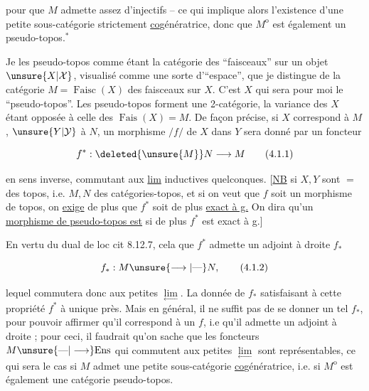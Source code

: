 pour que $M$ admette assez d'injectifs -- ce qui implique alors l'existence d'une petite sous-catégorie strictement \uline{co}génératrice, donc que $M^{\mathrm{o}}$ est également un pseudo-topos.$^{*}$


Je  les  pseudo-topos comme étant la catégorie des ``faisceaux'' sur un objet $\unsure{X|\mathcal X}$, visualisé comme une sorte  d'``espace'', que je distingue de la catégorie $M=\operatorname{Faisc}(X)$ des faisceaux sur $X$.  C'est $X$ qui sera pour moi le ``pseudo-topos''. Les pseudo-topos forment une 2-catégorie, la variance des $X$ étant opposée à celle des  $\operatorname{Fais}(X)=M$.  De façon précise, si $X$ correspond à $M$, $\unsure{Y|\mathcal Y}$ à $N$, un morphisme $/f/$ de $X$ dans $Y$ sera donné par un foncteur


\[
f^{*}:\deleted{\unsure{M}}N\longrightarrow M
\tag*{(4.1.1)}
\]

en sens inverse, commutant  aux \uline{lim} inductives quelconques. [\uline{NB} si $X,Y$ sont $=$ des topos, i.e. $M,N$ des catégories-topos,  et si on veut que $f$ soit un morphisme de topos, on \uline{exige} de plus que $f^{*}$ soit de plus \uline{exact à g.} On dira qu'un \uline{morphisme de pseudo-topos est}  si de plus $f^{*}$ est exact à g.]

En vertu du dual de loc cit 8.12.7, cela  que $f^{*}$ admette un adjoint à droite $f_{*}$

\[
f_{*}:M\unsure{\longrightarrow|\text{---}}N,
\tag*{(4.1.2)}
\]

lequel commutera donc aux petites $\underset{\longleftarrow}{\lim}$. La donnée de $f_{*}$ satisfaisant à cette propriété   $f^{*}$ à  unique près. Mais en général, il ne suffit pas de se donner un tel $f_{*}$, pour pouvoir affirmer qu'il correspond à un $f$, i.e qu'il admette un adjoint à droite ; pour ceci, il faudrait qu'on sache que les foncteurs $M\unsure{\text{---}|\longrightarrow}\mathrm{Ens}$ qui commutent aux petites $\underset{\longleftarrow}{\lim}$ sont représentables, ce qui sera le cas si $M$ admet une petite sous-catégorie \uline{co}génératrice, i.e. si $M^{\mathrm{o}}$ est également une catégorie pseudo-topos.

